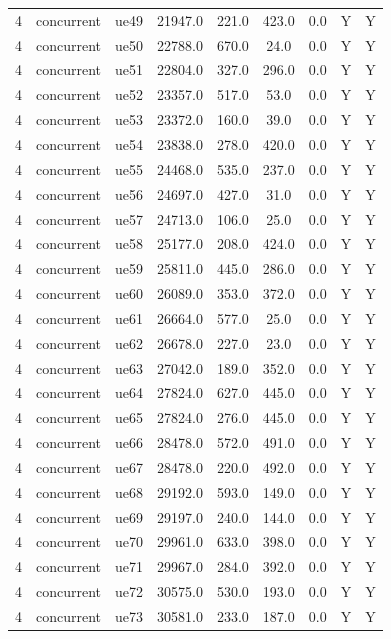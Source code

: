 \begin{table}[ht]
\begin{tabular}{|c|c|c|c|c|c|c|c|c|}
4 & concurrent & ue49 & 21947.0 & 221.0 & 423.0 & 0.0 & Y & Y \\
4 & concurrent & ue50 & 22788.0 & 670.0 & 24.0 & 0.0 & Y & Y \\
4 & concurrent & ue51 & 22804.0 & 327.0 & 296.0 & 0.0 & Y & Y \\
4 & concurrent & ue52 & 23357.0 & 517.0 & 53.0 & 0.0 & Y & Y \\
4 & concurrent & ue53 & 23372.0 & 160.0 & 39.0 & 0.0 & Y & Y \\
4 & concurrent & ue54 & 23838.0 & 278.0 & 420.0 & 0.0 & Y & Y \\
4 & concurrent & ue55 & 24468.0 & 535.0 & 237.0 & 0.0 & Y & Y \\
4 & concurrent & ue56 & 24697.0 & 427.0 & 31.0 & 0.0 & Y & Y \\
4 & concurrent & ue57 & 24713.0 & 106.0 & 25.0 & 0.0 & Y & Y \\
4 & concurrent & ue58 & 25177.0 & 208.0 & 424.0 & 0.0 & Y & Y \\
4 & concurrent & ue59 & 25811.0 & 445.0 & 286.0 & 0.0 & Y & Y \\
4 & concurrent & ue60 & 26089.0 & 353.0 & 372.0 & 0.0 & Y & Y \\
4 & concurrent & ue61 & 26664.0 & 577.0 & 25.0 & 0.0 & Y & Y \\
4 & concurrent & ue62 & 26678.0 & 227.0 & 23.0 & 0.0 & Y & Y \\
4 & concurrent & ue63 & 27042.0 & 189.0 & 352.0 & 0.0 & Y & Y \\
4 & concurrent & ue64 & 27824.0 & 627.0 & 445.0 & 0.0 & Y & Y \\
4 & concurrent & ue65 & 27824.0 & 276.0 & 445.0 & 0.0 & Y & Y \\
4 & concurrent & ue66 & 28478.0 & 572.0 & 491.0 & 0.0 & Y & Y \\
4 & concurrent & ue67 & 28478.0 & 220.0 & 492.0 & 0.0 & Y & Y \\
4 & concurrent & ue68 & 29192.0 & 593.0 & 149.0 & 0.0 & Y & Y \\
4 & concurrent & ue69 & 29197.0 & 240.0 & 144.0 & 0.0 & Y & Y \\
4 & concurrent & ue70 & 29961.0 & 633.0 & 398.0 & 0.0 & Y & Y \\
4 & concurrent & ue71 & 29967.0 & 284.0 & 392.0 & 0.0 & Y & Y \\
4 & concurrent & ue72 & 30575.0 & 530.0 & 193.0 & 0.0 & Y & Y \\
4 & concurrent & ue73 & 30581.0 & 233.0 & 187.0 & 0.0 & Y & Y \\

\end{tabular}
\end{table}

